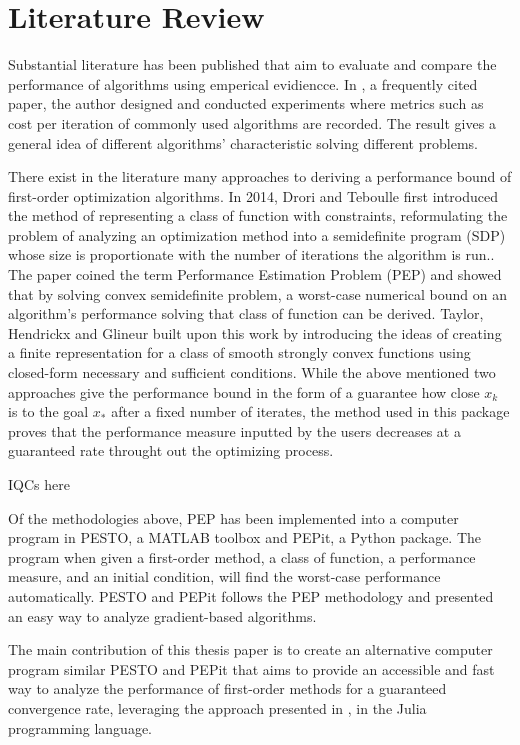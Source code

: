 \chapter{Literature Review}

Substantial literature has been published that aim to evaluate and compare the performance of algorithms using emperical evidiencce. In \cite{adam}, a frequently cited paper, the author designed and conducted experiments where metrics such as cost per iteration of commonly used algorithms are recorded. The result gives a general idea of different algorithms' characteristic solving different problems.

There exist in the literature many approaches to deriving a performance bound of first-order optimization algorithms. In 2014, Drori and Teboulle first introduced the method of representing a class of function with constraints, reformulating the problem of analyzing an optimization method into a semidefinite program (SDP) whose size is proportionate with the number of iterations the algorithm is run.\cite{drori2012}. The paper coined the term Performance Estimation Problem (PEP) and showed that by solving convex semidefinite problem, a worst-case numerical bound on an algorithm's performance solving that class of function can be derived. Taylor, Hendrickx and Glineur built upon this work by introducing the ideas of creating a finite representation for a class of smooth strongly convex functions using closed-form necessary and sufficient conditions. While the above mentioned two approaches give the performance bound in the form of a guarantee how close \(x_k\) is to the goal \(x_*\) after a fixed number of iterates, the method used in this package proves that the performance measure inputted by the users decreases at a guaranteed rate throught out the optimizing process.

IQCs here

Of the methodologies above, PEP has been implemented into a computer program in PESTO, a MATLAB toolbox and PEPit, a Python package. The program when given a first-order method, a class of function, a performance measure, and an initial condition, will find the worst-case performance automatically. PESTO and PEPit follows the PEP methodology and presented an easy way to analyze gradient-based algorithms.

The main contribution of this thesis paper is to create an alternative computer program similar PESTO and PEPit that aims to provide an accessible and fast way to analyze the performance of first-order methods for a guaranteed convergence rate, leveraging the approach presented in \cite{tutorial}, in the Julia programming language.